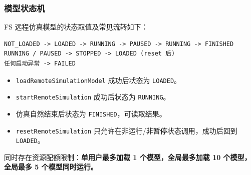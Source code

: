 \subsubsection{模型状态机}
FS 远程仿真模型的状态取值及常见流转如下：
\begin{lstlisting}
NOT_LOADED -> LOADED -> RUNNING -> PAUSED -> RUNNING -> FINISHED
RUNNING / PAUSED -> STOPPED -> LOADED (reset 后)
任何启动异常 -> FAILED
\end{lstlisting}\vspace{-30pt}
\begin{itemize}
	\item \texttt{loadRemoteSimulationModel} 成功后状态为 \texttt{LOADED}。
	\item \texttt{startRemoteSimulation} 成功后状态为 \texttt{RUNNING}。
	\item 仿真自然结束后状态为 \texttt{FINISHED}，可读取结果。
	\item \texttt{resetRemoteSimulation} 只允许在非运行/非暂停状态调用，成功后回到 \texttt{LOADED}。
\end{itemize}
同时存在资源配额限制：\bf{单用户最多加载 1 个模型，全局最多加载 10 个模型，全局最多 5 个模型同时运行}。

